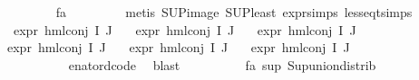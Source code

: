 \begin{isabellebody}
\ \ \ \ \ \ \isamarkupfalse%
\ fa{\isacharunderscore}{\kern0pt}{\isasympsi}{\isacharparenleft}{\kern0pt}{}{\isacharparenright}{\kern0pt}\ \isanewline
\ \ \ \ \ \ \isamarkupfalse%
\ {\isacharparenleft}{\kern0pt}metis\ SUP{\isacharunderscore}{\kern0pt}image\ SUP{\isacharunderscore}{\kern0pt}least\ expr{\isachardot}{\kern0pt}simps\ less{\isacharunderscore}{\kern0pt}eq{\isacharunderscore}{\kern0pt}t{\isachardot}{\kern0pt}simps{\isacharparenright}{\kern0pt}{\isacharplus}{\kern0pt}\isanewline
\isanewline
\ \ \ \ \ \ \isamarkupfalse%
\ {\isachardoublequoteopen}expr{\isacharunderscore}{\kern0pt}{}\ {\isacharparenleft}{\kern0pt}hml{\isacharunderscore}{\kern0pt}conj\ I\ J\ {\isasymPhi}{\isacharparenright}{\kern0pt}\ {\isasymle}\ {}{\isachardoublequoteclose}\isanewline
{\isachardoublequoteopen}expr{\isacharunderscore}{\kern0pt}{}\ {\isacharparenleft}{\kern0pt}hml{\isacharunderscore}{\kern0pt}conj\ I\ J\ {\isasymPhi}{\isacharparenright}{\kern0pt}\ {\isasymle}\ {\isasyminfinity}{\isachardoublequoteclose}\isanewline
{\isachardoublequoteopen}expr{\isacharunderscore}{\kern0pt}{}\ {\isacharparenleft}{\kern0pt}hml{\isacharunderscore}{\kern0pt}conj\ I\ J\ {\isasymPhi}{\isacharparenright}{\kern0pt}\ {\isasymle}\ {}{\isachardoublequoteclose}\isanewline
{\isachardoublequoteopen}expr{\isacharunderscore}{\kern0pt}{}\ {\isacharparenleft}{\kern0pt}hml{\isacharunderscore}{\kern0pt}conj\ I\ J\ {\isasymPhi}{\isacharparenright}{\kern0pt}\ {\isasymle}\ {}{\isachardoublequoteclose}\isanewline
{\isachardoublequoteopen}expr{\isacharunderscore}{\kern0pt}{}\ {\isacharparenleft}{\kern0pt}hml{\isacharunderscore}{\kern0pt}conj\ I\ J\ {\isasymPhi}{\isacharparenright}{\kern0pt}\ {\isasymle}\ {}{\isachardoublequoteclose}\isanewline
{\isachardoublequoteopen}expr{\isacharunderscore}{\kern0pt}{}\ {\isacharparenleft}{\kern0pt}hml{\isacharunderscore}{\kern0pt}conj\ I\ J\ {\isasymPhi}{\isacharparenright}{\kern0pt}\ {\isasymle}\ {}{\isachardoublequoteclose}\isanewline
\ \ \ \ \ \ \ \ \isamarkupfalse%
\ {}\isanewline
\ \ \ \ \ \ \ \ \isamarkupfalse%
\ enat{\isacharunderscore}{\kern0pt}ord{\isacharunderscore}{\kern0pt}code{\isacharparenleft}{\kern0pt}{}{\isacharparenright}{\kern0pt}\ \isamarkupfalse%
\ blast\isanewline
\ \ \ \ \ \ \ \ \isamarkupfalse%
\ fa{\isacharunderscore}{\kern0pt}{\isasympsi}\ sup{\isacharunderscore}{\kern0pt}{\isasymphi}\ Sup{\isacharunderscore}{\kern0pt}union{\isacharunderscore}{\kern0pt}distrib\isanewline

\end{isabellebody}
